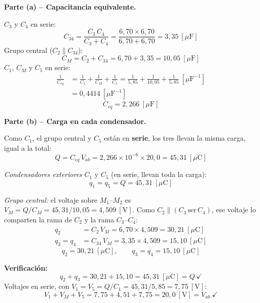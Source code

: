 \documentclass[12pt,letterpaper]{article}
\begin{document}
\medskip
\noindent\textbf{Parte (a) -- Capacitancia equivalente.}

$C_3$ y $C_4$ en serie:
\[
    C_{34} = \frac{C_3\,C_4}{C_3 + C_4} = \frac{6{,}70\times 6{,}70}{6{,}70+6{,}70} = 3{,}35\ [\mu\text{F}]
\]
Grupo central ($C_2 \parallel C_{34}$):
\[
    C_{M} = C_2 + C_{34} = 6{,}70 + 3{,}35 = 10{,}05\ [\mu\text{F}]
\]
$C_1$, $C_M$ y $C_5$ en serie:
\begin{align*}
    \frac{1}{C_{eq}} &= \frac{1}{C_1} + \frac{1}{C_M} + \frac{1}{C_5}
                      = \frac{1}{5{,}85} + \frac{1}{10{,}05} + \frac{1}{5{,}85}\ [\mu\text{F}^{-1}]\\[4pt]
                     &= 0{,}4414\ [\mu\text{F}^{-1}]
\end{align*}
\[
    \boxed{C_{eq} = 2{,}266\ [\mu\text{F}]}
\]

\medskip
\noindent\textbf{Parte (b) -- Carga en cada condensador.}

Como $C_1$, el grupo central y $C_5$ est\'an en \textbf{serie}, los tres llevan la misma carga,
igual a la total:
\[
    Q = C_{eq}\,V_{ab} = 2{,}266\times10^{-6}\times 20{,}0 = 45{,}31\ [\mu\text{C}]
\]

\noindent\emph{Condensadores exteriores} $C_1$ y $C_5$ (en serie, llevan toda la carga):
\[
    \boxed{q_1 = q_5 = Q = 45{,}31\ [\mu\text{C}]}
\]

\noindent\emph{Grupo central:} el voltaje sobre $M_1$--$M_2$ es
$V_M = Q/C_M = 45{,}31/10{,}05 = 4{,}509\ [\text{V}]$. Como $C_2 \parallel (C_3\,\text{ser}\,C_4)$,
ese voltaje lo comparten la rama de $C_2$ y la rama $C_3$--$C_4$:
\begin{align*}
    q_2 &= C_2\,V_M = 6{,}70\times 4{,}509 = 30{,}21\ [\mu\text{C}]\\[2pt]
    q_3 = q_4 &= C_{34}\,V_M = 3{,}35\times 4{,}509 = 15{,}10\ [\mu\text{C}]
\end{align*}
\[
    \boxed{q_2 = 30{,}21\ [\mu\text{C}],\qquad q_3 = q_4 = 15{,}10\ [\mu\text{C}]}
\]

\noindent\textbf{Verificaci\'on:}
\[
    q_2 + q_3 = 30{,}21 + 15{,}10 = 45{,}31\ [\mu\text{C}] = Q\ \checkmark
\]
Voltajes en serie, con $V_1 = V_5 = Q/C_1 = 45{,}31/5{,}85 = 7{,}75\ [\text{V}]$:
\[
    V_1 + V_M + V_5 = 7{,}75 + 4{,}51 + 7{,}75 = 20{,}0\ [\text{V}] = V_{ab}\ \checkmark
\]
\end{document}
